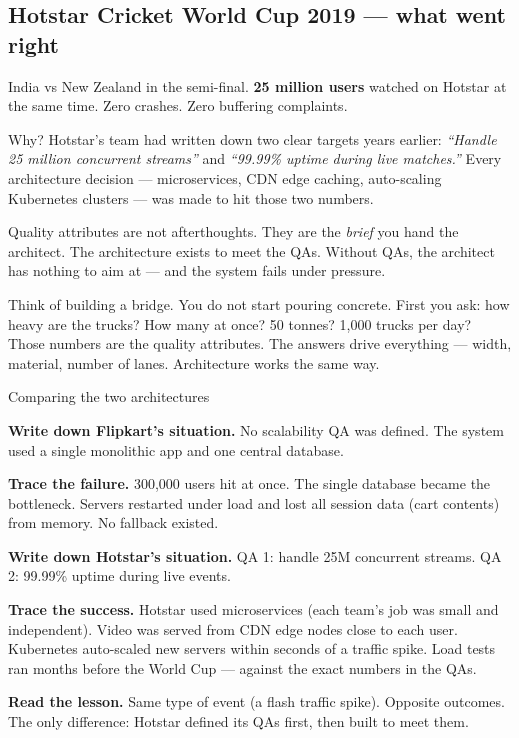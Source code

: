\documentclass[a4paper,11pt]{article}
\begin{document}
\subsection{Hotstar Cricket World Cup 2019 — what went right}

India vs New Zealand in the semi-final. \textbf{25 million users} watched on
Hotstar at the same time. Zero crashes. Zero buffering complaints.

Why? Hotstar's team had written down two clear targets years earlier:
\emph{``Handle 25 million concurrent streams''} and
\emph{``99.99\% uptime during live matches.''}
Every architecture decision — microservices, CDN edge caching, auto-scaling
Kubernetes clusters — was made to hit those two numbers.

\begin{intuition}
Quality attributes are not afterthoughts. They are the \emph{brief} you hand
the architect. The architecture exists to meet the QAs. Without QAs, the
architect has nothing to aim at — and the system fails under pressure.
\end{intuition}

\begin{everyday}
Think of building a bridge. You do not start pouring concrete. First you ask:
how heavy are the trucks? How many at once? 50 tonnes? 1{,}000 trucks per day?
Those numbers are the quality attributes. The answers drive everything — width,
material, number of lanes. Architecture works the same way.
\end{everyday}

\begin{worked}{Comparing the two architectures}
\begin{steps}
  \item \textbf{Write down Flipkart's situation.}
        No scalability QA was defined. The system used a single monolithic
        app and one central database.
  \item \textbf{Trace the failure.}
        300{,}000 users hit at once. The single database became the bottleneck.
        Servers restarted under load and lost all session data (cart contents)
        from memory. No fallback existed.
  \item \textbf{Write down Hotstar's situation.}
        QA 1: handle 25M concurrent streams.
        QA 2: 99.99\% uptime during live events.
  \item \textbf{Trace the success.}
        Hotstar used microservices (each team's job was small and independent).
        Video was served from CDN edge nodes close to each user.
        Kubernetes auto-scaled new servers within seconds of a traffic spike.
        Load tests ran months before the World Cup — against the exact numbers
        in the QAs.
  \item \textbf{Read the lesson.}
        Same type of event (a flash traffic spike). Opposite outcomes.
        The only difference: Hotstar defined its QAs first,
        then built to meet them.
\end{steps}
\end{worked}
\end{document}
